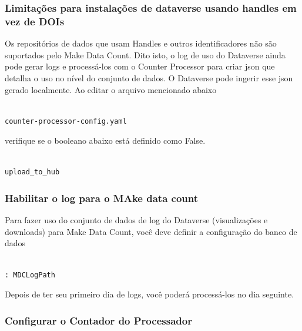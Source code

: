 \documentclass[12pt,hidelinks]{article}
\begin{document}
\subsubsection{Limitações para instalações de dataverse usando handles em vez de DOIs}

\qquad Os repositórios de dados que usam Handles e outros identificadores não são suportados pelo Make Data Count. Dito isto, o log de uso do Dataverse ainda pode gerar logs e processá-los com o Counter Processor para criar json que detalha o uso no nível do conjunto de dados. O Dataverse pode ingerir esse json gerado localmente. Ao editar o arquivo mencionado abaixo

\begin{verbatim}

counter-processor-config.yaml

\end{verbatim}

verifique se o booleano abaixo está definido como False.

\begin{verbatim}

upload_to_hub

\end{verbatim}

\subsubsection{Habilitar o log para o MAke data count}

\qquad Para fazer uso do conjunto de dados de log do Dataverse (visualizações e downloads) para Make Data Count, você deve definir a configuração do banco de dados

\begin{verbatim}

: MDCLogPath

\end{verbatim}

Depois de ter seu primeiro dia de logs, você poderá processá-los no dia seguinte.

\subsubsection{Configurar o Contador do Processador}
\end{document}
